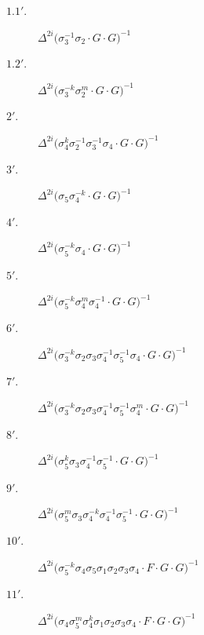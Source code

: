 \begin{description}
    \item[$1.1'.$] $\displaystyle \Delta^{2i} \big( \allowbreak\sigma_{3}^{-1}\allowbreak\sigma_{2} \cdot G \cdot G \big)^{-1}$
    \item[$1.2'.$] $\displaystyle \Delta^{2i} \big( \allowbreak\sigma_{3}^{-k}\allowbreak\sigma_{2}^{m} \cdot G \cdot G \big)^{-1}$
    \item[$2'.$] $\displaystyle \Delta^{2i} \big( \allowbreak\sigma_{4}^{k}\allowbreak\sigma_{2}^{-1}\allowbreak\sigma_{3}^{-1}\allowbreak\sigma_{4} \cdot G \cdot G \big)^{-1}$
    \item[$3'.$] $\displaystyle \Delta^{2i} \big( \allowbreak\sigma_{5}\allowbreak\sigma_{4}^{-k} \cdot G \cdot G \big)^{-1}$
    \item[$4'.$] $\displaystyle \Delta^{2i} \big( \allowbreak\sigma_{5}^{-k}\allowbreak\sigma_{4} \cdot G \cdot G \big)^{-1}$
    \item[$5'.$] $\displaystyle \Delta^{2i} \big( \allowbreak\sigma_{5}^{-k}\allowbreak\sigma_{4}^{m}\allowbreak\sigma_{4}^{-1} \cdot G \cdot G \big)^{-1}$
    \item[$6'.$] $\displaystyle \Delta^{2i} \big( \allowbreak\sigma_{3}^{-k}\allowbreak\sigma_{2}\allowbreak\sigma_{3}\allowbreak\sigma_{4}^{-1}\allowbreak\sigma_{5}^{-1}\allowbreak\sigma_{4} \cdot G \cdot G \big)^{-1}$
    \item[$7'.$] $\displaystyle \Delta^{2i} \big( \allowbreak\sigma_{3}^{-k}\allowbreak\sigma_{2}\allowbreak\sigma_{3}\allowbreak\sigma_{4}^{-1}\allowbreak\sigma_{5}^{-1}\allowbreak\sigma_{4}^{m} \cdot G \cdot G \big)^{-1}$
    \item[$8'.$] $\displaystyle \Delta^{2i} \big( \allowbreak\sigma_{5}^{k}\allowbreak\sigma_{3}\allowbreak\sigma_{4}^{-1}\allowbreak\sigma_{5}^{-1} \cdot G \cdot G \big)^{-1}$
    \item[$9'.$] $\displaystyle \Delta^{2i} \big( \allowbreak\sigma_{5}^{m}\allowbreak\sigma_{3}\allowbreak\sigma_{4}^{-k}\allowbreak\sigma_{4}^{-1}\allowbreak\sigma_{5}^{-1} \cdot G \cdot G \big)^{-1}$
    \item[$10'.$] $\displaystyle \Delta^{2i} \big( \allowbreak\sigma_{5}^{-k}\allowbreak\sigma_{4}\allowbreak\sigma_{5}\allowbreak\sigma_{1}\allowbreak\sigma_{2}\allowbreak\sigma_{3}\allowbreak\sigma_{4} \cdot F \cdot G \cdot G \big)^{-1}$
    \item[$11'.$] $\displaystyle \Delta^{2i} \big( \allowbreak\sigma_{4}\allowbreak\sigma_{5}^{m}\allowbreak\sigma_{4}^{k}\allowbreak\sigma_{1}\allowbreak\sigma_{2}\allowbreak\sigma_{3}\allowbreak\sigma_{4} \cdot F \cdot G \cdot G \big)^{-1}$

\end{description}

